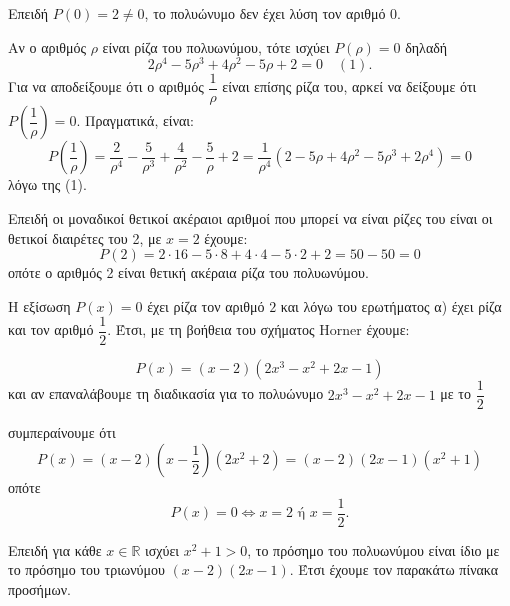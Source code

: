 \begin{alist}
\item 
\begin{rlist}
\item Επειδή $P(0) = 2 \ne 0$, το πολυώνυμο δεν έχει λύση τον αριθμό 0.
\item Αν ο αριθμός $\rho$ είναι ρίζα του πολυωνύμου, τότε ισχύει $P(\rho) = 0$ δηλαδή
\[2\rho^4 - 5\rho^3 + 4\rho^2 - 5\rho + 2 = 0 \quad (1).\]
Για να αποδείξουμε ότι ο αριθμός $\dfrac{1}{\rho}$ είναι επίσης ρίζα του, αρκεί να δείξουμε ότι $P\left(\dfrac{1}{\rho}\right) = 0$.
Πραγματικά, είναι:
\[P\left(\dfrac{1}{\rho}\right) = \dfrac{2}{\rho^4} - \dfrac{5}{\rho^3} + \dfrac{4}{\rho^2} - \dfrac{5}{\rho} + 2 = \dfrac{1}{\rho^4}(2 - 5\rho + 4\rho^2 - 5\rho^3 + 2\rho^4) = 0\]
λόγω της (1).
\end{rlist}
\item Επειδή οι μοναδικοί θετικοί ακέραιοι αριθμοί που μπορεί να είναι ρίζες του είναι οι θετικοί διαιρέτες του 2, με $x = 2$ έχουμε:
\[P(2) = 2 \cdot 16 - 5 \cdot 8 + 4 \cdot 4 - 5 \cdot 2 + 2 = 50 - 50 = 0\]
οπότε ο αριθμός 2 είναι θετική ακέραια ρίζα του πολυωνύμου.
\item Η εξίσωση $P(x) = 0$ έχει ρίζα τον αριθμό $2$ και λόγω του ερωτήματος α) έχει ρίζα και τον αριθμό $\dfrac{1}{2}$.
Έτσι, με τη βοήθεια του σχήματος Horner έχουμε:
\begin{center}
\end{center}
\[P(x) = (x - 2)(2x^3 - x^2 + 2x - 1)\]
και αν επαναλάβουμε τη διαδικασία για το πολυώνυμο $2x^3 - x^2 + 2x - 1$ με το $\dfrac{1}{2}$
\begin{center}
\end{center}
συμπεραίνουμε ότι
\[P(x) = (x - 2)\left(x - \dfrac{1}{2}\right)(2x^2 + 2) = (x - 2)(2x - 1)(x^2 + 1)\]
οπότε
\[P(x) = 0 \Leftrightarrow x = 2 \text{ ή } x = \dfrac{1}{2}.\]
\item Επειδή για κάθε $x \in \mathbb{R}$ ισχύει $x^2 + 1 > 0$, το πρόσημο του πολυωνύμου είναι ίδιο με το πρόσημο του τριωνύμου $(x - 2)(2x - 1)$. Έτσι έχουμε τον παρακάτω πίνακα προσήμων.
\end{alist}

